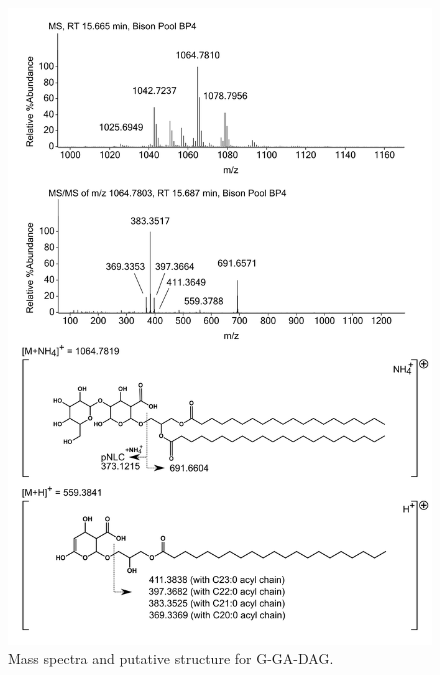 \begin{figure}[h]
       \includegraphics[width=\linewidth]{figs_app1/G-GA-DAG}
       \caption{Mass spectra and putative structure for G-GA-DAG.}
\label{fig:G-GA-DAG}
\end{figure}